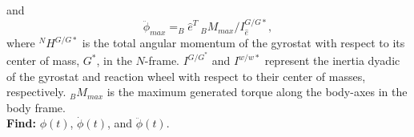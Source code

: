 \documentclass[letterpaper, preprint, paper,11pt]{AAS}	%
\begin{document}
	
	and
	\begin{equation}\label{phiddotmax}
	\ddot{\phi}_{max}=_B\hat{e}^T\  _BM_{max}/I_{\hat{e}}^{G/G*},
	\end{equation}
	where $^NH^{G/G*}$ is the total angular momentum of the gyrostat with respect to its center of mass, $G^*$, in the $N$-frame. $I^{G/G^*}$ and $I^{w/w*}$ represent the inertia dyadic of the gyrostat and reaction wheel with respect to their center of masses, respectively. $_BM_{max}$ is the maximum generated torque along the body-axes in the body frame. \\
	
	{\bf Find:} $\phi(t)$, $\dot{\phi}(t)$, and $\ddot{\phi}(t)$.
	
	
\end{document}
